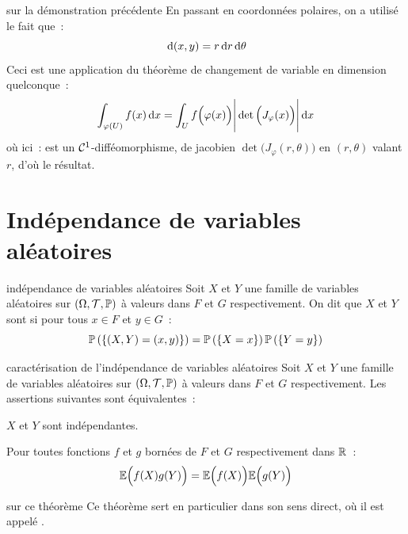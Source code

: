 \begin{remarque}{}{sur la démonstration précédente}
    En passant en coordonnées polaires, on a utilisé le fait que~:
    $$\,\mathrm{d}(x,y) = r\,\mathrm{d}r\,\mathrm{d}\theta$$
    Ceci est une application du théorème de changement de variable en dimension quelconque~:
    $$\int_{\varphi(U)} f(x)\,\mathrm{d}x = \int_{U} f\Big(\varphi(x)\Big)\Bigg\vert\det\Big(J_\varphi(x)\Big)\Bigg\vert\,\mathrm{d}x$$
    où ici~: 
    \fonction{\varphi}{U = \R_+ \times [0; 2\pi[}{\R^2}{(r,\theta)}{\Big(r \cos(\theta), r \sin(\theta)\Big)}
    est un $\mathcal{C}^1$-difféomorphisme, de jacobien $\det\Big(J_\varphi(r,\theta)\Big)$ en $(r, \theta)$ valant $r$, d'où le résultat.
    
\end{remarque}




\section{Indépendance de variables aléatoires}

\begin{definition}{}{indépendance de variables aléatoires}
    Soit $X$ et $Y$ une famille de variables aléatoires sur $(\Omega, \mathcal{T}, \mathbb{P})$ à valeurs dans $F$ et $G$ respectivement. On dit que $X$ et $Y$ sont  si pour tous $x \in F$ et $y \in G$~:
    $$\mathbb{P}\left(\left\{(X,Y) = (x,y)\right\}\right) = \mathbb{P}\left(\left\{X=x\right\}\right)\mathbb{P}\left(\left\{Y = y\right\}\right)$$
    
\end{definition}

\begin{theoreme}{}{caractérisation de l'indépendance de variables aléatoires}
    Soit $X$ et $Y$ une famille de variables aléatoires sur $(\Omega, \mathcal{T}, \mathbb{P})$ à valeurs dans $F$ et $G$ respectivement. Les assertions suivantes sont équivalentes~:
    \begin{enumeratebf}
        \item $X$ et $Y$ sont indépendantes.
        \item Pour toutes fonctions $f$ et $g$ bornées de $F$ et $G$ respectivement dans $\mathbb{R}$~:
        $$\mathbb{E}\Big(f(X)g(Y)\Big) = \mathbb{E}\Big(f(X)\Big)\mathbb{E}\Big(g(Y)\Big)$$
    \end{enumeratebf}
    
\end{theoreme}

\begin{remarque}{}{sur ce théorème}
    Ce théorème sert en particulier dans son sens direct, où il est appelé .
\end{remarque}

